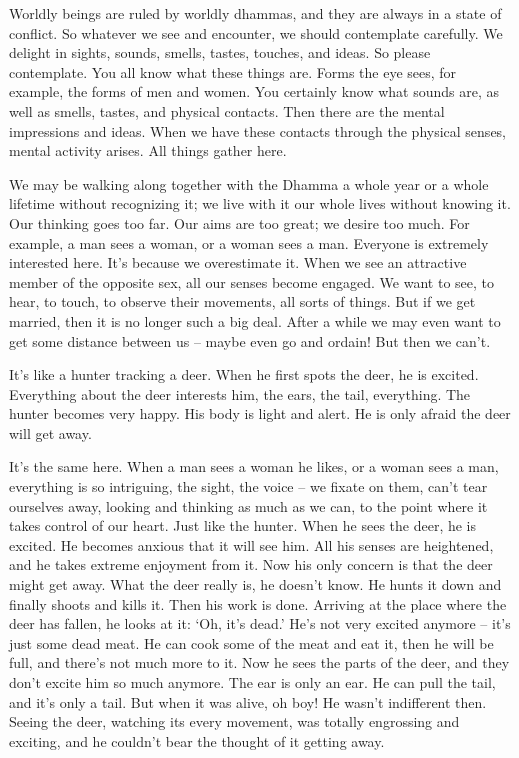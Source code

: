 Worldly beings are ruled by worldly dhammas, and they are always in a state of conflict. So whatever we see and encounter, we should contemplate carefully. We delight in sights, sounds, smells, tastes, touches, and ideas. So please contemplate. You all know what these things are. Forms the eye sees, for example, the forms of men and women. You certainly know what sounds are, as well as smells, tastes, and physical contacts. Then there are the mental impressions and ideas. When we have these contacts through the physical senses, mental activity arises. All things gather here.

We may be walking along together with the Dhamma a whole year or a whole lifetime without recognizing it; we live with it our whole lives without knowing it. Our thinking goes too far. Our aims are too great; we desire too much. For example, a man sees a woman, or a woman sees a man. Everyone is extremely interested here. It's because we overestimate it. When we see an attractive member of the opposite sex, all our senses become engaged. We want to see, to hear, to touch, to observe their movements, all sorts of things. But if we get married, then it is no longer such a big deal. After a while we may even want to get some distance between us -- maybe even go and ordain! But then we can't.

It's like a hunter tracking a deer. When he first spots the deer, he is excited. Everything about the deer interests him, the ears, the tail, everything. The hunter becomes very happy. His body is light and alert. He is only afraid the deer will get away.

It's the same here. When a man sees a woman he likes, or a woman sees a man, everything is so intriguing, the sight, the voice -- we fixate on them, can't tear ourselves away, looking and thinking as much as we can, to the point where it takes control of our heart. Just like the hunter. When he sees the deer, he is excited. He becomes anxious that it will see him. All his senses are heightened, and he takes extreme enjoyment from it. Now his only concern is that the deer might get away. What the deer really is, he doesn't know. He hunts it down and finally shoots and kills it. Then his work is done. Arriving at the place where the deer has fallen, he looks at it: `Oh, it's dead.' He's not very excited anymore -- it's just some dead meat. He can cook some of the meat and eat it, then he will be full, and there's not much more to it. Now he sees the parts of the deer, and they don't excite him so much anymore. The ear is only an ear. He can pull the tail, and it's only a tail. But when it was alive, oh boy! He wasn't indifferent then. Seeing the deer, watching its every movement, was totally engrossing and exciting, and he couldn't bear the thought of it getting away.

